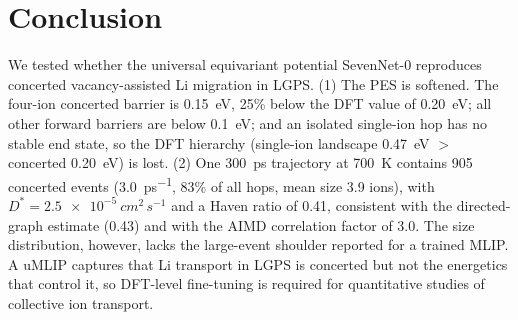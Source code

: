 \documentclass[11pt,a4paper]{article}
\begin{document}
\section{Conclusion}
We tested whether the universal equivariant potential SevenNet-0 reproduces concerted vacancy-assisted Li migration in LGPS. (1) The PES is softened. The four-ion concerted barrier is \SI{0.15}{eV}, 25\% below the DFT value of \SI{0.20}{eV}; all other forward barriers are below \SI{0.1}{eV}; and an isolated single-ion hop has no stable end state, so the DFT hierarchy (single-ion landscape \SI{0.47}{eV} $>$ concerted \SI{0.20}{eV}) is lost. (2) One \SI{300}{ps} trajectory at \SI{700}{K} contains 905 concerted events (\SI{3.0}{ps^{-1}}, 83\% of all hops, mean size 3.9 ions), with $D^*=\SI{2.5e-5}{cm^2\,s^{-1}}$ and a Haven ratio of 0.41, consistent with the directed-graph estimate (0.43) and with the AIMD correlation factor of 3.0. The size distribution, however, lacks the large-event shoulder reported for a trained MLIP. A uMLIP captures that Li transport in LGPS is concerted but not the energetics that control it, so DFT-level fine-tuning is required for quantitative studies of collective ion transport.
\end{document}
